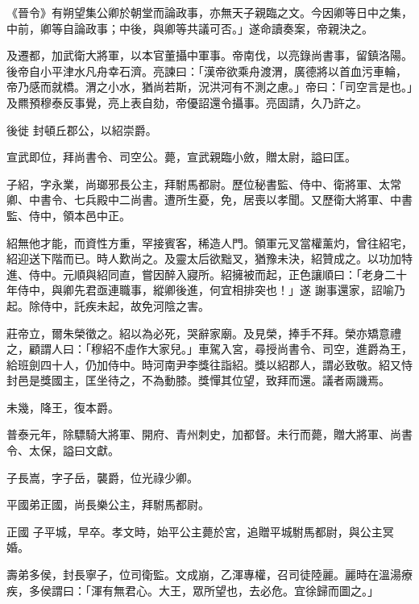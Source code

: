 \begin{pinyinscope}
 《晉令》有朔望集公卿於朝堂而論政事，亦無天子親臨之文。今因卿等日中之集，中前，卿等自論政事；中後，與卿等共議可否。」遂命讀奏案，帝親決之。



 及遷都，加武衛大將軍，以本官董攝中軍事。帝南伐，以亮錄尚書事，留鎮洛陽。後帝自小平津水凡舟幸石濟。亮諫曰：「漢帝欲乘舟渡渭，廣德將以首血污車輪，帝乃感而就橋。渭之小水，猶尚若斯，況洪河有不測之慮。」帝曰：「司空言是也。」及羆預穆泰反事覺，亮上表自劾，帝優詔還令攝事。亮固請，久乃許之。



 後徙
 封頓丘郡公，以紹崇爵。



 宣武即位，拜尚書令、司空公。薨，宣武親臨小斂，贈太尉，謚曰匡。



 子紹，字永業，尚瑯邪長公主，拜駙馬都尉。歷位秘書監、侍中、衛將軍、太常卿、中書令、七兵殿中二尚書。遭所生憂，免，居喪以孝聞。又歷衛大將軍、中書監、侍中，領本邑中正。



 紹無他才能，而資性方重，罕接賓客，稀造人門。領軍元叉當權薰灼，曾往紹宅，紹迎送下階而已。時人歎尚之。及靈太后欲黜叉，猶豫未決，紹贊成之。以功加特進、侍中。元順與紹同直，嘗因醉入寢所。紹擁被而起，正色讓順曰：「老身二十年侍中，與卿先君亟連職事，縱卿後進，何宜相排突也！」遂
 謝事還家，詔喻乃起。除侍中，託疾未起，故免河陰之害。



 莊帝立，爾朱榮徵之。紹以為必死，哭辭家廟。及見榮，捧手不拜。榮亦矯意禮之，顧謂人曰：「穆紹不虛作大家兒。」車駕入宮，尋授尚書令、司空，進爵為王，給班劍四十人，仍加侍中。時河南尹李獎往詣紹。獎以紹郡人，謂必致敬。紹又恃封邑是獎國主，匡坐待之，不為動膝。獎憚其位望，致拜而還。議者兩譏焉。



 未幾，降王，復本爵。



 普泰元年，除驃騎大將軍、開府、青州刺史，加都督。未行而薨，贈大將軍、尚書令、太保，謚曰文獻。



 子長嵩，字子岳，襲爵，位光祿少卿。



 平國弟正國，尚長樂公主，拜駙馬都尉。



 正國
 子平城，早卒。孝文時，始平公主薨於宮，追贈平城駙馬都尉，與公主冥婚。



 壽弟多侯，封長寧子，位司衛監。文成崩，乙渾專權，召司徒陸麗。麗時在溫湯療疾，多侯謂曰：「渾有無君心。大王，眾所望也，去必危。宜徐歸而圖之。」




\end{pinyinscope}
